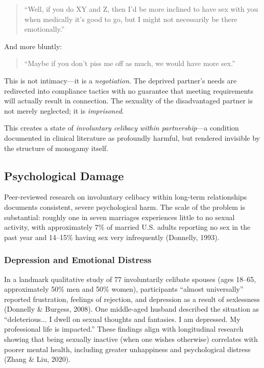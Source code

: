 \documentclass[12pt, letterpaper]{article}
\begin{document}
\begin{quote}
``Well, if you do XY and Z, then I'd be more inclined to have sex with you when medically it's good to go, but I might not necessarily be there emotionally.''
\end{quote}

And more bluntly:

\begin{quote}
``Maybe if you don't piss me off as much, we would have more sex.''
\end{quote}

This is not intimacy---it is a \textit{negotiation}. The deprived partner's needs are redirected into compliance tactics with no guarantee that meeting requirements will actually result in connection. The sexuality of the disadvantaged partner is not merely neglected; it is \textit{imprisoned}.

This creates a state of \textit{involuntary celibacy within partnership}---a condition documented in clinical literature as profoundly harmful, but rendered invisible by the structure of monogamy itself.

\subsection{Psychological Damage}

Peer-reviewed research on involuntary celibacy within long-term relationships documents consistent, severe psychological harm. The scale of the problem is substantial: roughly one in seven marriages experiences little to no sexual activity, with approximately 7\% of married U.S. adults reporting no sex in the past year and 14--15\% having sex very infrequently (Donnelly, 1993).

\subsubsection{Depression and Emotional Distress}

In a landmark qualitative study of 77 involuntarily celibate spouses (ages 18--65, approximately 50\% men and 50\% women), participants ``almost universally'' reported frustration, feelings of rejection, and depression as a result of sexlessness (Donnelly \& Burgess, 2008). One middle-aged husband described the situation as ``deleterious... I dwell on sexual thoughts and fantasies. I am depressed. My professional life is impacted.'' These findings align with longitudinal research showing that being sexually inactive (when one wishes otherwise) correlates with poorer mental health, including greater unhappiness and psychological distress (Zhang \& Liu, 2020).
\end{document}
